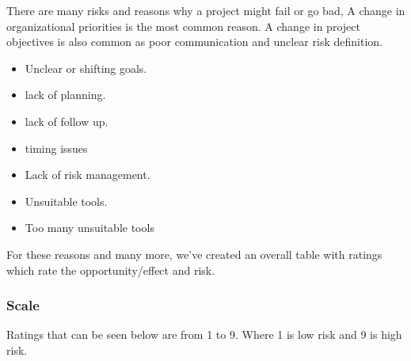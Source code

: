 There are many risks and reasons why a project might fail or go bad, A change in organizational priorities is the most common reason. A change in project objectives is also common as poor communication and unclear risk definition.
	\begin{itemize}
		\setlength\itemsep{-0.3em}
		\item Unclear or shifting goals.
		\item lack of planning.
		\item lack of follow up.
		\item timing issues 
		\item Lack of risk management.
		\item Unsuitable tools.
		\item Too many unsuitable tools
	\end{itemize}

\noindent
For these reasons and many more, we’ve created an overall table with ratings which rate the opportunity/effect and risk.

\subsubsection{Scale} %
Ratings that can be seen below are from 1 to 9. Where 1 is low risk and 9 is high risk.\\
	
